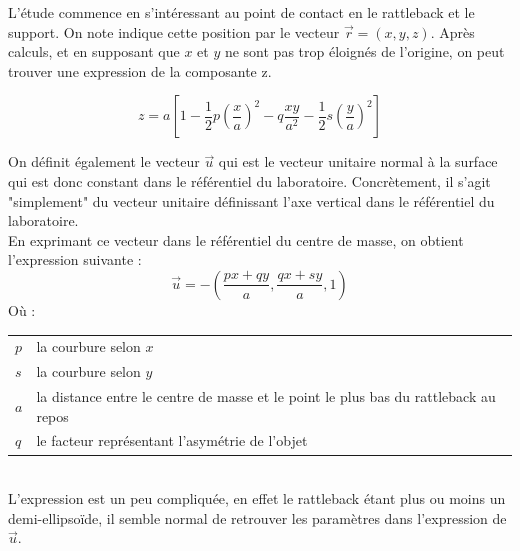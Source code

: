 \documentclass[12pt,a4paper]{article}
\begin{document}
	L'étude commence en s'intéressant au point de contact en le rattleback et le support. On note indique cette position par le vecteur $\vec{r}=(x,y,z)$. Après calculs, et en supposant que $x$ et $y$ ne sont pas trop éloignés de l'origine, on peut trouver une expression de la composante z.
	
	\begin{equation}
	z=a\left[ 1-\dfrac {1} {2}p\left( \dfrac {x} {a}\right) ^{2}-q\dfrac {xy} {a^{2}}-\dfrac {1} {2}s\left( \dfrac {y} {a}\right) ^{2}\right]
	\label{eq:z}
	\end{equation}
	
	On définit également le vecteur $\vec{u}$ qui est le vecteur unitaire normal à la surface qui est donc constant dans le référentiel du laboratoire. Concrètement, il s'agit "simplement" du vecteur unitaire définissant l'axe vertical dans le référentiel du laboratoire.\\
	
	En exprimant ce vecteur dans le référentiel du centre de masse, on obtient l'expression suivante :
	\begin{equation}
	\vec{u}=-\left(\dfrac{px+qy}{a},\dfrac{qx+sy}{a},1\right)
	\label{eq:uNormal}
	\end{equation}
	Où : \\
	\begin{tabular}{ll}
		$p$ &la courbure selon $x$\\
		$s$ &la courbure selon $y$\\
		$a$ &la distance entre le centre de masse et le point le plus bas du rattleback au repos\\
		$q$ &le facteur représentant l'asymétrie de l'objet
	\end{tabular}
	\\
	
	L'expression est un peu compliquée, en effet le rattleback étant plus ou moins un demi-ellipsoïde, il semble normal de retrouver les paramètres dans l'expression de $\vec{u}$.\\
	
\end{document}
